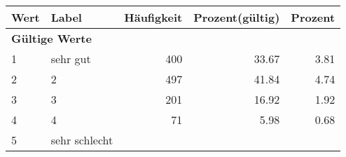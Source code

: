      \begin{longtable}{lXrrr}
     \toprule
     \textbf{Wert} & \textbf{Label} & \textbf{Häufigkeit} & \textbf{Prozent(gültig)} & \textbf{Prozent} \\
     \endhead
     \midrule
     \multicolumn{5}{l}{\textbf{Gültige Werte}}\\

     1 &
     \multicolumn{1}{X}{ sehr gut   } &


       \num{400} &
       \num[round-mode=places,round-precision=2]{33.67} &
         \num[round-mode=places,round-precision=2]{3.81} \\

     2 &
     \multicolumn{1}{X}{ 2   } &


       \num{497} &
       \num[round-mode=places,round-precision=2]{41.84} &
         \num[round-mode=places,round-precision=2]{4.74} \\

     3 &
     \multicolumn{1}{X}{ 3   } &


       \num{201} &
       \num[round-mode=places,round-precision=2]{16.92} &
         \num[round-mode=places,round-precision=2]{1.92} \\

     4 &
     \multicolumn{1}{X}{ 4   } &


       \num{71} &
       \num[round-mode=places,round-precision=2]{5.98} &
         \num[round-mode=places,round-precision=2]{0.68} \\

     5 &
     \multicolumn{1}{X}{ sehr schlecht   } &



\end{longtable}
